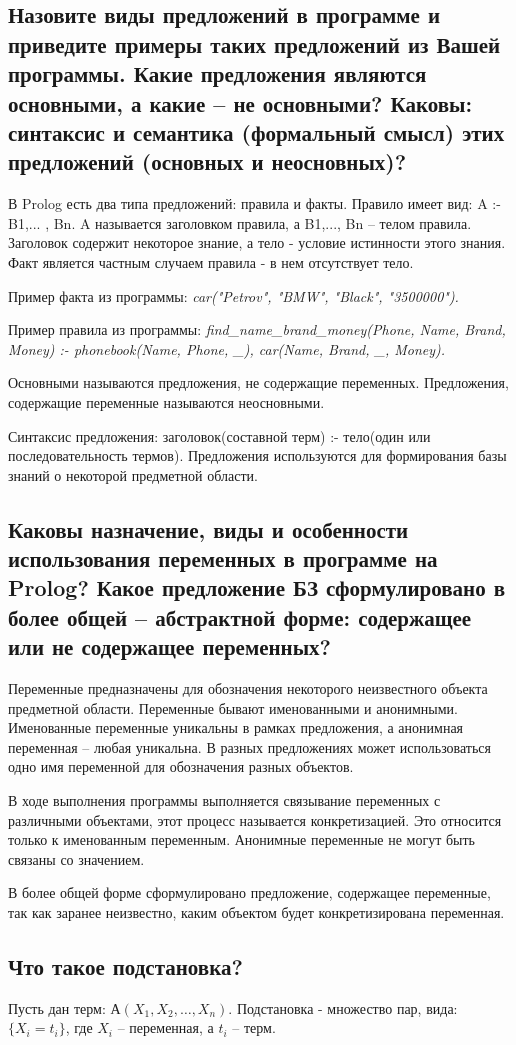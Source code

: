 \documentclass[a4paper,12pt]{article}
\begin{document}
\subsection*{Назовите виды предложений в программе и приведите примеры таких предложений из Вашей программы. Какие предложения являются основными, а какие – не основными?  Каковы: синтаксис и семантика (формальный смысл) этих предложений (основных и неосновных)?}
В Prolog есть два типа предложений: правила и факты. Правило имеет вид: A :- B1,... , Bn. 
A называется заголовком правила, а B1,..., Bn – телом правила. Заголовок содержит некоторое знание, а тело - условие истинности этого знания. Факт является частным случаем правила - в нем отсутствует тело.

Пример факта из программы: \emph{car("Petrov"{}, "BMW"{}, "Black"{}, "3500000"). }

Пример правила из программы: \emph{find\_name\_brand\_money(Phone, Name, Brand, Money) :- phonebook(Name, Phone, \_), car(Name, Brand, \_, Money). }

Основными называются предложения, не содержащие переменных. Предложения, содержащие переменные называются неосновными. 

Синтаксис предложения: заголовок(составной терм) :- тело(один или последовательность термов). Предложения используются для формирования базы знаний о некоторой предметной области.
\subsection*{Каковы назначение, виды и особенности использования переменных в программе на Prolog? Какое предложение БЗ сформулировано в более общей – абстрактной форме: содержащее или не содержащее переменных?}
Переменные предназначены для обозначения некоторого неизвестного объекта предметной области. Переменные бывают именованными и анонимными. Именованные переменные уникальны в рамках предложения, а анонимная переменная – любая уникальна. В разных предложениях может использоваться одно имя переменной для обозначения разных объектов.

В ходе выполнения программы выполняется связывание переменных с различными объектами, этот процесс называется конкретизацией. Это относится только к именованным переменным. Анонимные переменные не могут быть связаны со значением.

В более общей форме сформулировано предложение, содержащее переменные, так как заранее неизвестно, каким объектом будет конкретизирована переменная.
\subsection*{Что такое подстановка?}
Пусть дан терм: $А(X_1, X_2,  \dots ,X_n)$.
Подстановка - множество пар, вида: \\ $\{X _ i = t _ i\}$, где $X_i$ –   переменная, а $t_i$ –  терм.
\end{document}
